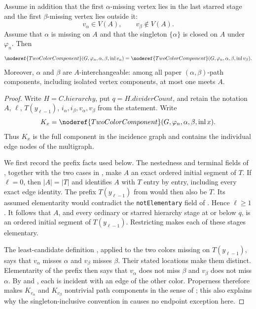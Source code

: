 \begin{lemma}
Assume in addition that the first $\alpha$-missing vertex lies in the
last starred stage and the first $\beta$-missing vertex lies outside it:
\[
        v_\alpha\in V(A),\qquad v_\beta\notin V(A).
\]
Assume that $\alpha$ is missing on $A$ and that the singleton
$\{\alpha\}$ is closed on $A$ under $\varphi_n$.  Then
\[
 \noderef{TwoColorComponent}(G,\varphi_n,\alpha,\beta,
       \operatorname{inl}v_\alpha)
 =
 \noderef{TwoColorComponent}(G,\varphi_n,\alpha,\beta,
       \operatorname{inl}v_\beta).
\]
Moreover, $\alpha$ and $\beta$ are $A$-interchangeable: among all paper
$(\alpha,\beta)$-path components, including isolated vertex components,
at most one meets $A$.
\end{lemma}
\begin{proof}
Write $H=C.\mathit{hierarchy}$, put
$q=H.\mathit{dividerCount}$, and retain the notation $A$, $\ell$,
$T(y_{\ell-1})$, $i_\alpha,i_\beta,v_\alpha,v_\beta$ from the
statement.  Write
\[
 K_x=\noderef{TwoColorComponent}
       (G,\varphi_n,\alpha,\beta,\operatorname{inl}x).
\]
Thus $K_x$ is the full component in the incidence graph and contains the
individual edge nodes of the multigraph.

We first record the prefix facts used below.  The nestedness and terminal
fields of , together with the two cases in
, make $A$ an exact ordered initial
segment of $T$.  If $\ell=0$, then $|A|=|T|$ and
 identifies $A$ with $T$ entry by
entry, including every exact edge identity.  The prefix
$T(y_{\ell-1})$ from  would then also be
$T$.  Its assumed elementarity would contradict the
\texttt{notElementary} field of .  Hence
$\ell\geq1$.  It follows that $A$, and every ordinary or starred
hierarchy stage at or below $q$, is an ordered initial segment of
$T(y_{\ell-1})$.  Restricting
 makes each of these stages
elementary.

The least-candidate definition
, applied to the two colors
missing on $T(y_{\ell-1})$, says that $v_\alpha$ misses $\alpha$ and
$v_\beta$ misses $\beta$.  Their stated locations make them distinct.
Elementarity of the prefix then says that $v_\alpha$ does not miss
$\beta$ and $v_\beta$ does not miss $\alpha$.  By
 and , each is incident
with an edge of the other color.  Properness therefore makes $K_{v_\alpha}$
and $K_{v_\beta}$ nontrivial path components in the sense of
; this also explains why the
singleton-inclusive convention in  causes
no endpoint exception here.


\end{proof}
